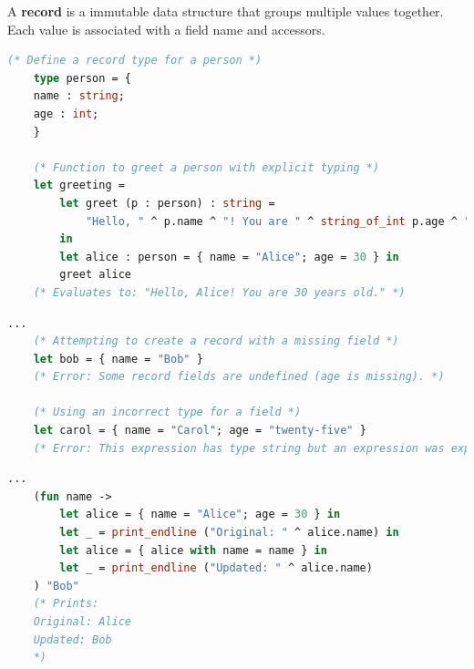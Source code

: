\begin{Def}

A \textbf{record} is a immutable data structure that groups multiple values together. Each value is associated with a field name and accessors.

    \begin{lstlisting}[language=OCaml, caption={Defining and Using Records}, numbers=none]
    (* Define a record type for a person *)
    type person = {
    name : string;
    age : int;
    }

    (* Function to greet a person with explicit typing *)
    let greeting =
        let greet (p : person) : string =
            "Hello, " ^ p.name ^ "! You are " ^ string_of_int p.age ^ " years old."
        in
        let alice : person = { name = "Alice"; age = 30 } in
        greet alice
    (* Evaluates to: "Hello, Alice! You are 30 years old." *)
    \end{lstlisting}

\begin{lstlisting}[language=OCaml, caption={Incorrect Usage Example}, numbers=none]
...
    (* Attempting to create a record with a missing field *)
    let bob = { name = "Bob" }
    (* Error: Some record fields are undefined (age is missing). *)

    (* Using an incorrect type for a field *)
    let carol = { name = "Carol"; age = "twenty-five" }
    (* Error: This expression has type string but an expression was expected of type int. *)
\end{lstlisting}

    \begin{lstlisting}[language=OCaml, caption={Updating Records}, numbers=none]
    ...
    (fun name ->
        let alice = { name = "Alice"; age = 30 } in
        let _ = print_endline ("Original: " ^ alice.name) in
        let alice = { alice with name = name } in
        let _ = print_endline ("Updated: " ^ alice.name)
    ) "Bob"
    (* Prints:
    Original: Alice
    Updated: Bob
    *)
\end{lstlisting}
\end{Def}

\newpage 


